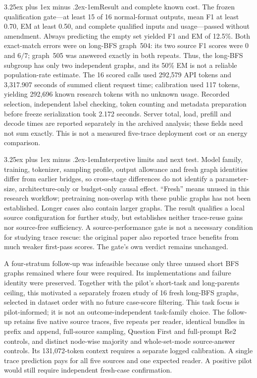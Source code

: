 \documentclass[10pt]{article}
\makeatletter
\renewcommand\paragraph{\@startsection{paragraph}{4}{\parindent}%
  {3.25ex plus 1ex minus .2ex}{-1em}{\normalfont\normalsize\bfseries}}
\makeatother
\begin{document}
\paragraph{Result and complete known cost.} The frozen qualification gate---at least 15 of 16 normal-format outputs, mean F1 at least 0.70, EM at least 0.50, and complete qualified inputs and usage---passed without amendment. Always predicting the empty set yielded F1 and EM of 12.5\%. Both exact-match errors were on long-BFS graph~504: its two source F1 scores were 0 and $6/7$; graph~505 was answered exactly in both repeats. Thus, the long-BFS subgroup has only two independent graphs, and its 50\% EM is not a reliable population-rate estimate. The 16 scored calls used 292,579 API tokens and 3,317.907 seconds of summed client request time; calibration used 117 tokens, yielding 292,696 known research tokens with no unknown usage. Recorded selection, independent label checking, token counting and metadata preparation before freeze serialization took 2.172 seconds. Server total, load, prefill and decode times are reported separately in the archived analysis; these fields need not sum exactly. This is not a measured five-trace deployment cost or an energy comparison.

\paragraph{Interpretive limits and next test.} Model family, training, tokenizer, sampling profile, output allowance and fresh graph identities differ from earlier bridges, so cross-stage differences do not identify a parameter-size, architecture-only or budget-only causal effect. ``Fresh'' means unused in this research workflow; pretraining non-overlap with these public graphs has not been established. Longer cases also contain larger graphs. The result qualifies a local source configuration for further study, but establishes neither trace-reuse gains nor source-free sufficiency. A source-performance gate is not a necessary condition for studying trace rescue: the original paper also reported trace benefits from much weaker first-pass scores. The gate's own verdict remains unchanged.

A four-stratum follow-up was infeasible because only three unused short BFS graphs remained where four were required. Its implementations and failure identity were preserved. Together with the pilot's short-task and long-parents ceiling, this motivated a separately frozen study of 16 fresh long-BFS graphs, selected in dataset order with no future case-score filtering. This task focus is pilot-informed; it is not an outcome-independent task-family choice. The follow-up retains five native source traces, five repeats per reader, identical bundles in prefix and append, full-source sampling, Question First and full-prompt Re2 controls, and distinct node-wise majority and whole-set-mode source-answer controls. Its 131,072-token context requires a separate logged calibration. A single trace prediction pays for all five sources and one expected reader. A positive pilot would still require independent fresh-case confirmation.
\end{document}
